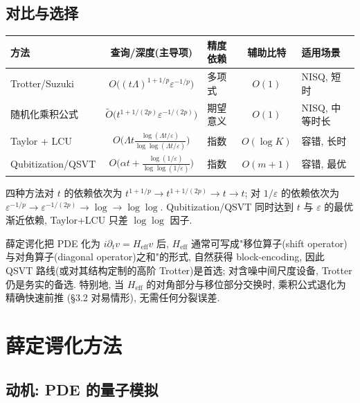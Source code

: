 \documentclass[utf8]{article} %
\numberwithin{equation}{section}   %
\newtheorem{Note}{\hskip 2em {\color{red} 注}}[subsection]
\begin{document}
\subsection{对比与选择}

\begin{center}
\begin{tabular}{@{}lclcl@{}}
    \toprule
    方法 & 查询/深度(主导项) & 精度依赖 & 辅助比特 & 适用场景 \\
    \midrule
    Trotter/Suzuki & $O\big((t\Lambda)^{1+1/p}\varepsilon^{-1/p}\big)$ & 多项式 & $O(1)$ & NISQ, 短时 \\
    随机化乘积公式 & $\widetilde O\big(t^{1+1/(2p)}\varepsilon^{-1/(2p)}\big)$ & 期望意义 & $O(1)$ & NISQ, 中等时长 \\
    Taylor + LCU & $O\big(\Lambda t\frac{\log(\Lambda t/\varepsilon)}{\log\log(\Lambda t/\varepsilon)}\big)$ & 指数 & $O(\log K)$ & 容错, 长时 \\
    Qubitization/QSVT & $O\!\big(\alpha t + \frac{\log(1/\varepsilon)}{\log\log(1/\varepsilon)}\big)$ & 指数 & $O(m+1)$ & 容错, 最优 \\
    \bottomrule
\end{tabular}
\end{center}

\begin{Note}[查询下界视角的排序]
    四种方法对 $t$ 的依赖依次为 $t^{1+1/p} \to t^{1+1/(2p)} \to t \to t$;
    对 $1/\varepsilon$ 的依赖依次为 $\varepsilon^{-1/p} \to \varepsilon^{-1/(2p)}
    \to \log \to \log\log$. Qubitization/QSVT 同时达到 $t$ 与 $\varepsilon$ 的最优
    渐近依赖, Taylor+LCU 只差 $\log\log$ 因子.
\end{Note}

\begin{Note}[薛定谔化管线中的选择]
    薛定谔化把 PDE 化为 $i\partial_t v = H_{\mathrm{eff}} v$ 后, $H_{\mathrm{eff}}$
    通常可写成"移位算子(shift operator)与对角算子(diagonal operator)之和"的形式, 自然获得 block-encoding,
    因此 QSVT 路线(或对其结构定制的高阶 Trotter)是首选;
    对含噪中间尺度设备, Trotter 仍是务实的备选.
    特别地, 当 $H_{\mathrm{eff}}$ 的对角部分与移位部分交换时, 乘积公式退化为精确快速前推
    (§3.2 对易情形), 无需任何分裂误差.
\end{Note}

\section{薛定谔化方法}

\subsection{动机: PDE 的量子模拟}
\end{document}
